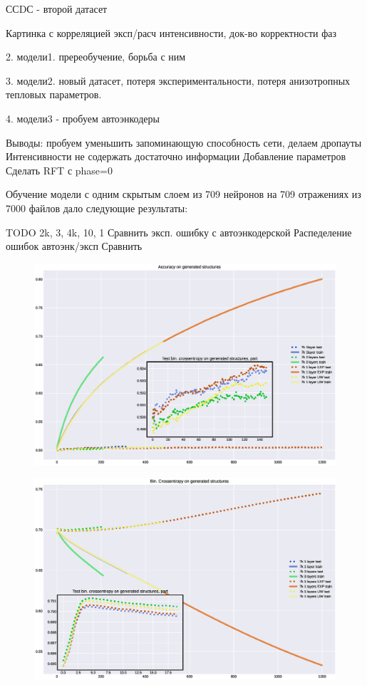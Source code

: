 \documentclass{article}
\begin{document}
ССDС - второй датасет

Картинка с корреляцией эксп/расч интенсивности, док-во корректности фаз

2. модели1. пререобучение, борьба с ним

3. модели2. новый датасет, потеря экспериментальности, потеря анизотропных тепловых параметров. 

4. модели3 - пробуем автоэнкодеры

Выводы:
пробуем уменьшить запоминающую способность сети, делаем дропауты
Интенсивности не содержать достаточно информации
Добавление параметров
Сделать RFT с phase=0
 
Обучение модели с одним скрытым слоем из 709 нейронов на 709 отражениях из 7000 файлов дало следующие результаты:

TODO 2k, 3, 4k, 10, 1
Сравнить эксп. ошибку с автоэнкодерской
Распеделение ошибок автоэнк/эксп
Сравнить 

\begin{figure}[h!tp]
\centering
\includegraphics[scale=.500]{imgs/acc-7k.eps}
\caption{}
\label{}

\end{figure}
\begin{figure}[h!tp]
\centering
\includegraphics[scale=.500]{imgs/loss-7k.eps}
\caption{}
\label{}
\end{figure}
\end{document}
